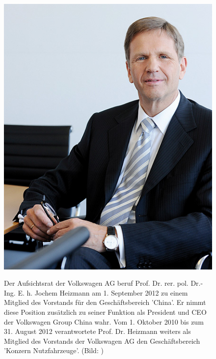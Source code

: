 \documentclass[12pt]{article}
\begin{document}
\begin{figure}[here!]
	\centering
	\begin{minipage}[h]{0.20\textwidth}
		\centering
		\includegraphics[width=1.0\textwidth]{images/JochemHeizmann.jpg}
		\label{fig:vorstandvw2}
	\end{minipage}
	\begin{minipage}[h]{0.10\textwidth}
		\hspace{1cm} 
	\end{minipage}
	\begin{minipage}[h]{0.65\textwidth}
		Der Aufsichtsrat der Volkswagen AG beruf Prof. Dr. rer. pol. Dr.-Ing. E. h. Jochem Heizmann am 1. September 2012 zu einem Mitglied des Vorstands für den Geschäftsbereich 'China'. Er nimmt diese Position zusätzlich zu seiner Funktion als President und CEO der Volkswagen Group China wahr. Vom 1. Oktober 2010 bis zum 31. August 2012 verantwortete Prof. Dr. Heizmann weiters als Mitglied des Vorstands der Volkswagen AG den Geschäftsbereich 'Konzern Nutzfahrzeuge'. (Bild: \cite{jhpic} )
	\end{minipage}
\end{figure}
\end{document}
